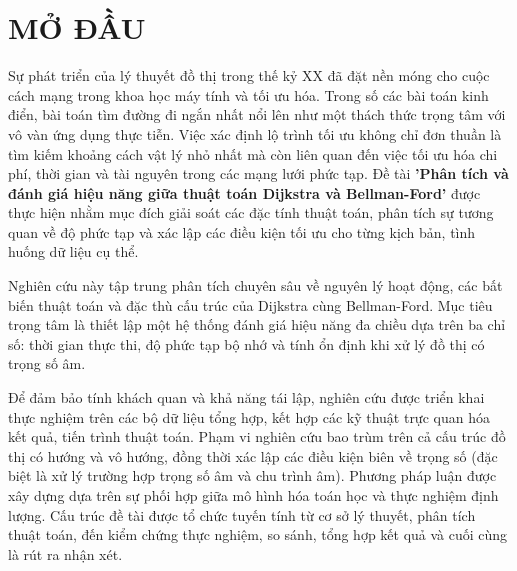 \documentclass[14pt,a4paper]{report}
\begin{document}
\newpage
\thispagestyle{empty}

\tableofcontents
\newpage

\listoffigures 
\newpage


\chapter*{MỞ ĐẦU}
\justifying
    \fontsize{12pt}{13pt}\selectfont
    Sự phát triển của lý thuyết đồ thị trong thế kỷ XX đã đặt nền móng cho cuộc cách mạng trong khoa học máy tính và tối ưu hóa. Trong số các bài toán kinh điển, bài toán tìm đường đi ngắn nhất nổi lên như một thách thức trọng tâm với vô vàn ứng dụng thực tiễn. Việc xác định lộ trình tối ưu không chỉ đơn thuần là tìm kiếm khoảng cách vật lý nhỏ nhất mà còn liên quan đến việc tối ưu hóa chi phí, thời gian và tài nguyên trong các mạng lưới phức tạp. Đề tài \textbf{'Phân tích và đánh giá hiệu năng giữa thuật toán Dijkstra và Bellman-Ford'} được thực hiện nhằm mục đích giải soát các đặc tính thuật toán, phân tích sự tương quan về độ phức tạp và xác lập các điều kiện tối ưu cho từng kịch bản, tình huống dữ liệu cụ thể.
    \vspace{2.5pt}
    
    Nghiên cứu này tập trung phân tích chuyên sâu về nguyên lý hoạt động, các bất biến thuật toán và đặc thù cấu trúc của Dijkstra cùng Bellman-Ford. Mục tiêu trọng tâm là thiết lập một hệ thống đánh giá hiệu năng đa chiều dựa trên ba chỉ số: thời gian thực thi, độ phức tạp bộ nhớ và tính ổn định khi xử lý đồ thị có trọng số âm.
    \vspace{2.5pt}
    
   Để đảm bảo tính khách quan và khả năng tái lập, nghiên cứu được triển khai thực nghiệm trên các bộ dữ liệu tổng hợp, kết hợp các kỹ thuật trực quan hóa kết quả, tiến trình thuật toán.  Phạm vi nghiên cứu bao trùm trên cả cấu trúc đồ thị có hướng và vô hướng, đồng thời xác lập các điều kiện biên về trọng số (đặc biệt là xử lý trường hợp trọng số âm và chu trình âm). Phương pháp luận được xây dựng dựa trên sự phối hợp giữa mô hình hóa toán học và thực nghiệm định lượng. Cấu trúc đề tài được tổ chức tuyến tính từ cơ sở lý thuyết, phân tích thuật toán, đến kiểm chứng thực nghiệm, so sánh, tổng hợp kết quả và cuối cùng là rút ra nhận xét.
   \vspace{2.5pt}
   
\end{document}
